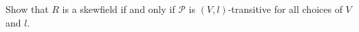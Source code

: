 Show that $R$ is a skewfield if and only if $\mathcal{P}$ is $(V, l)$-transitive for all choices of $V$ and $l$.
